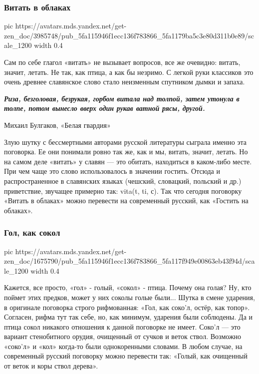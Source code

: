 \subsubsection{Витать в облаках}

\ifcmt
  pic https://avatars.mds.yandex.net/get-zen_doc/3985748/pub_5fa115946f1ecc136f783866_5fa1179ba5c3e80d311b0e89/scale_1200
  width 0.4
\fi

Сам по себе глагол «витать» не вызывает вопросов, все же очевидно: витать,
значит, летать. Не так, как птица, а как бы незримо. С легкой руки классиков
это очень древнее славянское слово стало неизменным спутником дымки и запаха.

\begin{leftbar}
  \begingroup
    \em\Large\bfseries\color{blue}
Риза, безголовая, безрукая, горбом витала над толпой, затем утонула в толпе,
потом вынесло вверх один рукав ватной рясы, другой.

Михаил Булгаков, «Белая гвардия»
  \endgroup
\end{leftbar}

Злую шутку с бессмертными авторами русской литературы сыграла именно эта
поговорка. Ее они понимали ровно так же, как и мы, витать, значит, летать. Но
на самом деле «витать» у славян — это обитать, находиться в каком-либо месте.
При чем чаще это слово использовалось в значении гостить. Отсюда и
распространенное в славянских языках (чешский, словацкий, польский и др.)
приветствие, звучащее примерно так: vita(t, ti, с). Так что сегодня поговорку
«Витать в облаках» можно перевести на современный русский, как «Гостить на
облаках».

\subsubsection{Гол, как сокол}


\ifcmt
  pic https://avatars.mds.yandex.net/get-zen_doc/1675790/pub_5fa115946f1ecc136f783866_5fa117f949e00863eb43f94d/scale_1200
  width 0.4
\fi

Кажется, все просто, «гол» - голый, «сокол» - птица. Почему она голая? Ну, кто
поймет этих предков, может у них соколы голые были... Шутка в смене ударения, в
оригинале поговорка строго рифмованная: «Гол, как соко'л, остёр, как топор».
Согласен, рифма тут так себе, но, как минимум, ударения были соблюдены. Да и
птица сокол никакого отношения к данной поговорке не имеет. Соко'л — это
вариант стенобитного орудия, очищенный от сучков и веток ствол. Возможно
«соко'л» и «кол» когда-то были однокоренными словами. В любом случае, на
современный русский поговорку можно перевести так: «Голый, как очищенный от
веток и коры ствол дерева».

